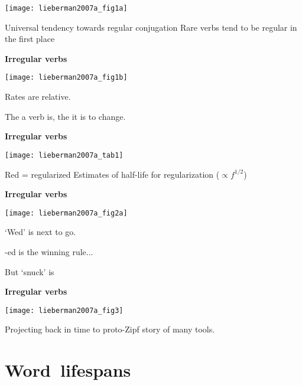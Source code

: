   
    \texttt{[image: lieberman2007a\_fig1a]}

    
     Universal tendency towards regular conjugation
     Rare verbs tend to be regular in the first place
    
  


  \textbf{Irregular verbs}

  
  \texttt{[image: lieberman2007a\_fig1b]}

  
  
    Rates are relative.
  
    The  a verb is, the 
    it is to change.
  
  


\begin{frame}[plain]
  \textbf{Irregular verbs}

  
    \texttt{[image: lieberman2007a\_tab1]}

    
     \alert{Red} = regularized
     Estimates of half-life for regularization ($\propto f^{1/2}$)
    
  


  \textbf{Irregular verbs}

  
  \texttt{[image: lieberman2007a\_fig2a]}

  
   
    `Wed' is next to go.
   
    -ed is the winning rule...
  
    But `snuck' is 
    \cite{michel2010a}
  
  


  \textbf{Irregular verbs}

  
  \texttt{[image: lieberman2007a\_fig3]}

  
   Projecting back in time to proto-Zipf story of many tools.
  
  


\section{Word\ lifespans}


\end{frame}
